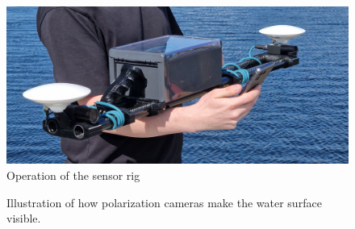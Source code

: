 \documentclass{iopconfser}
\begin{document}
\begin{figure}[H]
    \includegraphics[width=\textwidth]{figures/operation.jpg}
    \caption{Operation of the sensor rig}
\end{figure}


\begin{figure}[H]
    \hfill
    \caption{Illustration of how polarization cameras make the water surface visible.}
    \label{fig:polarization_visualization}
\end{figure}
\end{document}
